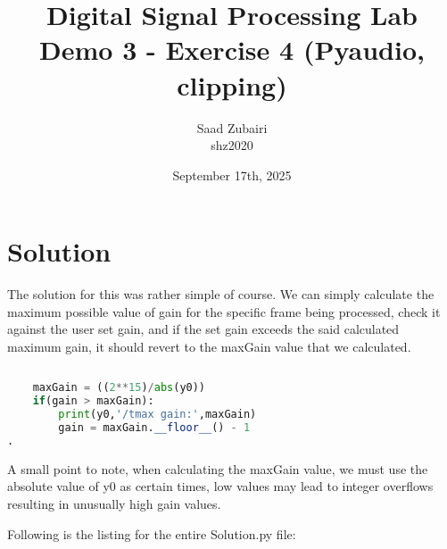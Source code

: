 \documentclass[11pt]{article}
\title{
    \vspace{3em}
    \textbf{Digital Signal Processing Lab}\\
    Demo 3 - Exercise 4 (Pyaudio, clipping)
    \vspace{1em}
}
\author{
    Saad Zubairi \\ 
    shz2020 \\
    \vspace{1em}
}
\date{September 17th, 2025}
\begin{document}
\maketitle	

\pagebreak

\section*{Solution}

The solution for this was rather simple of course. We can simply calculate the maximum possible value of gain for the specific frame being processed, check it against the user set gain, and if the set gain exceeds the said calculated maximum gain, it should revert to the maxGain value that we calculated.

\begin{lstlisting}[language=python, label={lst:code}, breaklines=true, caption={Snippet of the if function to enable clipping}]
    
    maxGain = ((2**15)/abs(y0))
    if(gain > maxGain):
        print(y0,'/tmax gain:',maxGain)
        gain = maxGain.__floor__() - 1
.
\end{lstlisting}

A small point to note, when calculating the maxGain value, we must use the absolute value of y0 as certain times, low values may lead to integer overflows resulting in unusually high gain values.

Following is the listing for the entire Solution.py file:
\end{document}
